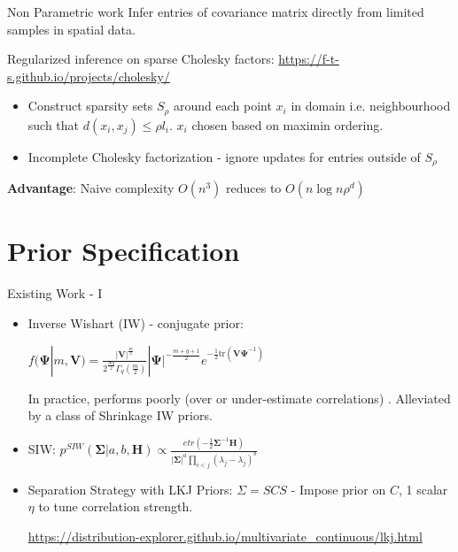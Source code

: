 \documentclass[usenames,dvipsnames]{beamer}
\theoremstyle{definition}
\let\oldcite=\cite
\renewcommand{\cite}[2][]{\textcolor{green}{\oldcite[#1]{#2}}}
\begin{document}
\begin{frame}{Non Parametric work}
\cite{Kidd2022}
Infer entries of covariance matrix directly from limited samples in spatial data.

Regularized inference on sparse Cholesky factors: \url{https://f-t-s.github.io/projects/cholesky/}
\begin{itemize}
    \item Construct sparsity sets $S_{\rho}$ around each point $x_i$ in domain i.e. neighbourhood such that $d(x_i, x_j) \leq \rho l_i$. $x_i$ chosen based on maximin ordering.
    
    \item Incomplete Cholesky factorization - ignore updates for entries outside of $S_{\rho}$
\end{itemize}

\textbf{Advantage}: Naive complexity $O(n^3)$ reduces to $O(n \log n \rho^d)$

\end{frame}




\section[Priors]{Prior Specification}
\begin{frame}{Existing Work - I}
    \begin{itemize}
    \item Inverse Wishart (IW) - conjugate prior:

    $f(\boldsymbol{\Psi}|m,\mathbf{V})=\frac{|\mathbf{V}|^{\frac{m}{2}}}{2^{\frac{mq}{2}}\Gamma_q(\frac{m}{2})}|\boldsymbol{\Psi}|^{-\frac{m+q+1}{2}}e^{-\frac{1}{2}\mathrm{tr}(\mathbf{V}\boldsymbol{\Psi}^{-1})}$
    
    
    In practice, performs poorly (over or under-estimate correlations) \cite{liu_comparison_2016}. Alleviated by a class of Shrinkage IW priors.

    \item SIW: \cite{berger_bayesian_2020}
    $p^{SIW}(\boldsymbol{\Sigma}|a,b,\mathbf{H})\propto\frac{etr(-\frac12\boldsymbol{\Sigma}^{-1}\mathbf{H})}{|\boldsymbol{\Sigma}|^a\prod_{i<j}(\lambda_j-\lambda_j)^b}$
    
    \item Separation Strategy with LKJ Priors:
    $\Sigma = S C S$ -  Impose prior on $C$, 1 scalar $\eta$ to tune correlation strength.

    \url{https://distribution-explorer.github.io/multivariate_continuous/lkj.html}

    \end{itemize}
\end{frame}
\end{document}
